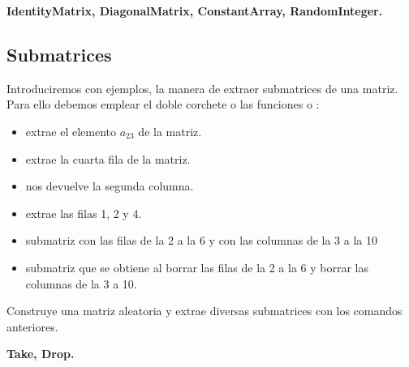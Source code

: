 \documentclass[a4paper,10pt, draft]{article}
\newcommand{\com}[1]{\textbf{\color{blue}{#1}}}
\newenvironment{ejer}{\begin{tcolorbox}[center title, title=Ejercicios,
fonttitle=\sffamily\bfseries,colback=blue!5,colframe=orange]}{\end{tcolorbox}}
\newenvironment{funciones}{\begin{tcolorbox}[center title, title=Nuevas funciones, fonttitle=\sffamily\bfseries, colback=green!5!white,colframe=red!75!black]}{\end{tcolorbox}\bigskip}
\begin{document}
\begin{funciones}

\textbf{IdentityMatrix, DiagonalMatrix, ConstantArray, Ran\-dom\-Integer.}


\end{funciones}


 \newpage

\subsection{Submatrices}

Introduciremos con ejemplos, la manera de extraer submatrices de una matriz. Para ello debemos emplear el doble corchete o las funciones \com{Take[m]} o \com{Drop[m]}:

\begin{itemize}

\item  \com{A[[2,3]]} extrae el elemento $a_{23}$ de la matriz.

\item  \com{A[[4]]} extrae la cuarta fila de la matriz. 


\item \com{A[[All, 2]]} nos devuelve la segunda columna.

\item \com{A[[\{1,2,4\},All]]} extrae las filas 1, 2 y 4.

\item \com{Take[A,\{2,6\},\{3,5\}]} submatriz con las filas de la 2 a la 6 y con las columnas de la 3 a la 10

\item \com{Drop[A,\{2,6\},\{3,5\}]} submatriz que se obtiene al borrar las filas de la 2 a la 6 y borrar las columnas de la 3 a 10.


\end{itemize}


\begin{ejer}

Construye una matriz aleatoria y extrae diversas submatrices con los comandos anteriores.


\end{ejer}


\begin{funciones}

\textbf{Take, Drop.}

\end{funciones}



\newpage
\end{document}
